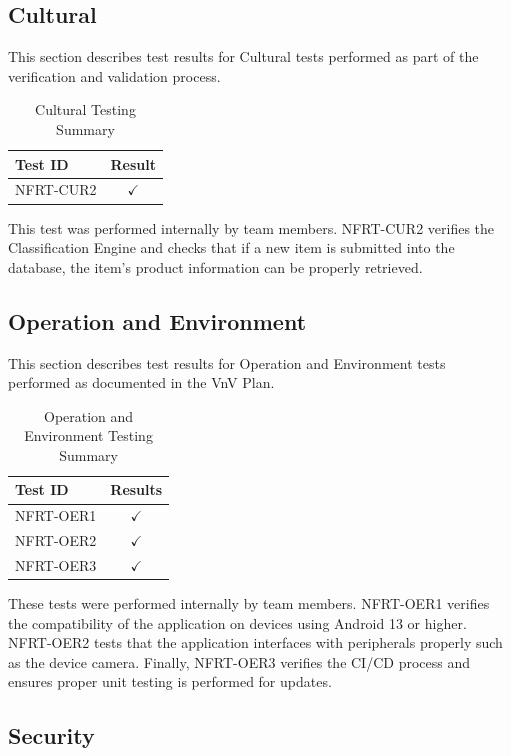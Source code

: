\documentclass[12pt, titlepage]{article}
\begin{document}
\subsection{Cultural}

This section describes test results for Cultural tests performed as part of the verification
and validation process.

\begin{longtable}{|l|c|}
  \caption{Cultural Testing Summary} \label{Cultural Testing Summary} \\
  \toprule
  \textbf{Test ID} & \textbf{Result} \\
  \midrule
  NFRT-CUR2 & $\checkmark$ \\
  \bottomrule
\end{longtable}

This test was performed internally by team members. NFRT-CUR2 verifies the Classification Engine
and checks that if a new item is submitted into the database, the item's product information can be
properly retrieved.

\subsection{Operation and Environment}

This section describes test results for Operation and Environment tests performed as documented
in the VnV Plan.

\begin{longtable}{|l|c|}
  \caption{Operation and Environment Testing Summary} \label{Operation and Environment Testing Summary} \\
  \toprule
  \textbf{Test ID} & \textbf{Results} \\
  \midrule
  NFRT-OER1 & $\checkmark$ \\
  \midrule
  NFRT-OER2 & $\checkmark$ \\
  \midrule
  NFRT-OER3 & $\checkmark$ \\ 
  \bottomrule
\end{longtable}

These tests were performed internally by team members. NFRT-OER1 verifies the compatibility of the application
on devices using Android 13 or higher. NFRT-OER2 tests that the application interfaces with peripherals properly
such as the device camera. Finally, NFRT-OER3 verifies the CI/CD process and ensures proper unit testing is performed
for updates.

\subsection{Security}
\end{document}
